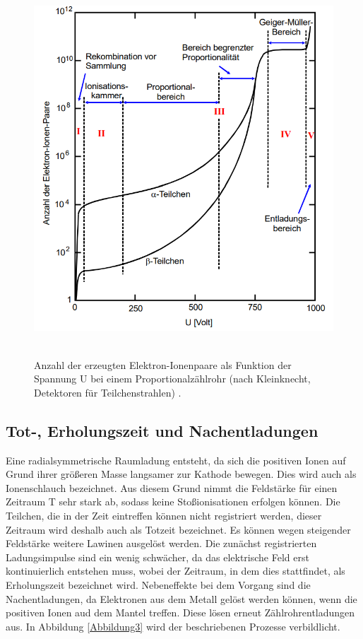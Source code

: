 \begin{figure}[H]
    \centering
    \includegraphics[height=140mm]{bilder/Ab2.png}
    \caption{Anzahl der erzeugten Elektron-Ionenpaare als Funktion der Spannung U bei einem Proportionalzählrohr (nach Kleinknecht, Detektoren für Teilchenstrahlen) \cite{a1}. \label{Abbildung2} }
\end{figure}

\subsection{Tot-, Erholungszeit und Nachentladungen}

\begin{flushleft}
    Eine radialsymmetrische Raumladung entsteht, da sich die positiven Ionen auf Grund ihrer größeren Masse langsamer zur Kathode bewegen. 
    Dies wird auch als Ionenschlauch bezeichnet. 
    Aus diesem Grund nimmt die Feldstärke für einen Zeitraum T sehr stark ab, sodass keine Stoßionisationen erfolgen können.
    Die Teilchen, die in der Zeit eintreffen können nicht registriert werden, dieser Zeitraum wird deshalb auch als Totzeit bezeichnet. 
    Es können wegen steigender Feldstärke weitere Lawinen ausgelöst werden. 
    Die zunächst registrierten Ladungsimpulse sind ein wenig schwächer, da das elektrische Feld erst kontinuierlich entstehen muss, wobei der Zeitraum, in dem dies stattfindet, als Erholungszeit bezeichnet wird. 
    Nebeneffekte bei dem Vorgang sind die Nachentladungen, da Elektronen aus dem Metall gelöst werden können, wenn die positiven Ionen aud dem Mantel treffen. 
    Diese lösen erneut Zählrohrentladungen aus. 
    In Abbildung \ref{Abbildung3} wird der beschriebenen Prozesse verbildlicht.
\end{flushleft}

